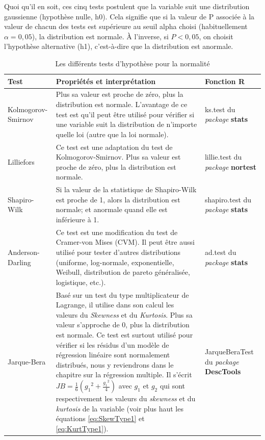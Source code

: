 \documentclass[
  11pt,
  french,
]{book}
\begin{document}
Quoi qu'il en soit, ces cinq tests postulent que la variable suit une distribution gaussienne (hypothèse nulle, h0). Cela signifie que si la valeur de P associée à la valeur de chacun des tests est supérieure au seuil alpha choisi (habituellement \(\alpha=0,05\)), la distribution est normale. À l'inverse, si \(P<0,05\), on choisit l'hypothèse alternative (h1), c'est-à-dire que la distribution est anormale.

\begin{table}

\caption{\label{tab:testnormalites}Les différents tests d'hypothèse pour la normalité}
\centering
\fontsize{8}{10}\selectfont
\begin{tabular}[t]{l>{\raggedright\arraybackslash}p{6cm}>{\raggedright\arraybackslash}p{6cm}}
\toprule
Test & Propriétés et interprétation & Fonction R\\
\midrule
Kolmogorov-Smirnov & Plus sa valeur est proche de zéro, plus la distribution est normale.  L'avantage de ce test est qu'il peut être utilisé pour vérifier si une variable suit la distribution de n'importe quelle loi (autre que la loi normale). & ks.test du \textit{package} \textbf{stats}\\
Lilliefors & Ce test est une adaptation du test de Kolmogorov-Smirnov. Plus sa valeur est proche de zéro, plus la distribution est normale. & lillie.test du \textit{package} \textbf{nortest}\\
Shapiro-Wilk & Si la valeur de la statistique de Shapiro-Wilk est proche de 1, alors la distribution est normale; et anormale quand elle est inférieure à 1. & shapiro.test du \textit{package} \textbf{stats}\\
Anderson-Darling & Ce test est une modification du test de Cramer-von Mises (CVM). Il peut être aussi utilisé pour tester d'autres distributions (uniforme, log-normale, exponentielle, Weibull, distribution de pareto généralisée, logistique, etc.). & ad.test du \textit{package} \textbf{stats}\\
Jarque-Bera & Basé sur un test du type multiplicateur de Lagrange, il utilise dans son calcul les valeurs du \textit{Skewness} et du \textit{Kurtosis}. Plus sa valeur s'approche de 0, plus la distribution est normale. Ce test est surtout utilisé pour vérifier si les résidus d'un modèle de régression linéaire sont normalement distribués, nous y reviendrons dans le chapitre sur la régression multiple. Il s'écrit $JB=\frac{1}{6} \left({g_1}^2+\frac{{g_1}^2}{4} \right)$ avec $g_1$ et $g_2$ qui sont respectivement les valeurs du \textit{skewness} et du \textit{kurtosis} de la variable (voir plus haut les équations \ref{eq:SkewType1} et \ref{eq:KurtType1}). & JarqueBeraTest du \textit{package} \textbf{DescTools}\\
\bottomrule
\end{tabular}
\end{table}
\end{document}
